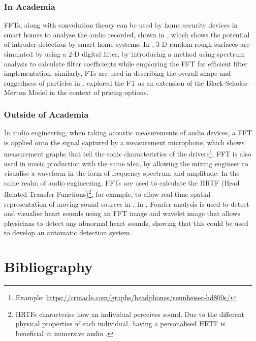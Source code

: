 \documentclass[a4paper, 10pt, conference]{ieeeconf}      %
\begin{document}
\subsubsection{In Academia} %
FFTs, along with convolution theory can be used by home security devices in smart homes to analyse the audio recorded, shown in \cite{Vadeiadis2020}, which shows the potential of intruder detection by smart home systems. In \cite{Hu1992}, 3-D random rough surfaces are simulated by using a 2-D digital filter, by introducing a method using spectrum analysis to calculate filter coefficients while employing the FFT for efficient filter implementation, similarly, FTs are used in describing the overall shape and ruggedness of particles in \cite{Wettimuny2004}. \cite{Orzechowski2019} explored the FT as an extension of the Black-Scholes-Merton Model in the context of pricing options.
\\
\subsubsection{Outside of Academia} %
In audio engineering, when taking acoustic measurements of audio devices, a FFT is applied onto the signal captured by a measurement microphone, which shows measurement graphs that tell the sonic characteristics of the drivers\footnote{Example: \url{https://crinacle.com/graphs/headphones/sennheiser-hd800s/}}. FFT is also used in music production with the same idea, by allowing the mixing engineer to visualise a waveform in the form of frequency spectrum and amplitude. In the same realm of audio engineering, FFTs are used to calculate the HRTF (Head Related Transfer Functions)\footnote{HRTFs characterise how an individual perceives sound. Due to the different physical properties of each individual, having a personalised HRTF is beneficial in immersive audio \cite{Oehler2023}.}, for example, to allow real-time spatial representation of moving sound sources in \cite{Tsakostas2007}.  In \cite{Nogata2012}, Fourier analysis is used to detect and visualise heart sounds using an FFT image and wavelet image that allows physicians to detect any abnormal heart sounds, showing that this could be used to develop an automatic detection system. 


\newpage
\section{Bibliography}


\end{document}
